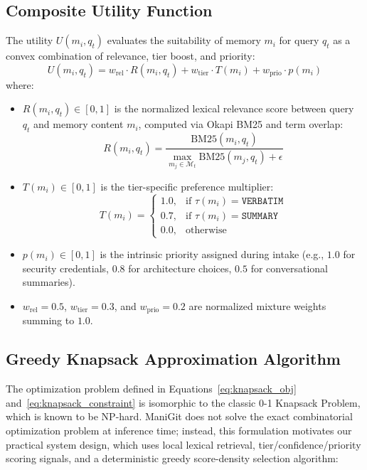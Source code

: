 \subsection{Composite Utility Function}
The utility $U(m_i, q_t)$ evaluates the suitability of memory $m_i$ for query $q_t$ as a convex combination of relevance, tier boost, and priority:
\begin{equation}
U(m_i, q_t) = w_{\text{rel}} \cdot R(m_i, q_t) + w_{\text{tier}} \cdot T(m_i) + w_{\text{prio}} \cdot p(m_i)
\label{eq:utility}
\end{equation}
where:
\begin{itemize}
    \item $R(m_i, q_t) \in [0, 1]$ is the normalized lexical relevance score between query $q_t$ and memory content $m_i$, computed via Okapi BM25 and term overlap:
    $$R(m_i, q_t) = \frac{\text{BM25}(m_i, q_t)}{\max_{m_j \in \mathcal{M}_t} \text{BM25}(m_j, q_t) + \epsilon}$$
    \item $T(m_i) \in [0, 1]$ is the tier-specific preference multiplier:
    $$T(m_i) = \begin{cases}
    1.0, & \text{if } \tau(m_i) = \texttt{VERBATIM} \\
    0.7, & \text{if } \tau(m_i) = \texttt{SUMMARY} \\
    0.0, & \text{otherwise}
    \end{cases}$$
    \item $p(m_i) \in [0, 1]$ is the intrinsic priority assigned during intake (e.g., $1.0$ for security credentials, $0.8$ for architecture choices, $0.5$ for conversational summaries).
    \item $w_{\text{rel}} = 0.5$, $w_{\text{tier}} = 0.3$, and $w_{\text{prio}} = 0.2$ are normalized mixture weights summing to $1.0$.
\end{itemize}

\subsection{Greedy Knapsack Approximation Algorithm}
The optimization problem defined in Equations~\eqref{eq:knapsack_obj} and~\eqref{eq:knapsack_constraint} is isomorphic to the classic 0-1 Knapsack Problem, which is known to be NP-hard. ManiGit does not solve the exact combinatorial optimization problem at inference time; instead, this formulation motivates our practical system design, which uses local lexical retrieval, tier/confidence/priority scoring signals, and a deterministic greedy score-density selection algorithm:

